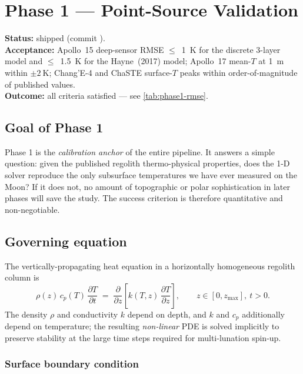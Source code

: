 \chapter{Phase 1 --- Point-Source Validation}
\label{chap:phase1}

\begin{milestone}
\textbf{Status:} shipped (commit ).\\
\textbf{Acceptance:} Apollo~15 deep-sensor RMSE $\le$~\SI{1}{\kelvin}
for the discrete 3-layer model and $\le$~\SI{1.5}{\kelvin} for the
Hayne~(2017) model; Apollo~17 mean-$T$ at \SI{1}{\meter} within
$\pm\SI{2}{\kelvin}$; Chang'E-4 and ChaSTE surface-$T$ peaks within
order-of-magnitude of published values.\\
\textbf{Outcome:} all criteria satisfied --- see
\cref{tab:phase1-rmse}.
\end{milestone}

\section{Goal of Phase 1}

Phase 1 is the \emph{calibration anchor} of the entire pipeline.  It
answers a simple question: given the published regolith thermo-physical
properties, does the 1-D solver reproduce the only subsurface
temperatures we have ever measured on the Moon?  If it does not, no
amount of topographic or polar sophistication in later phases will
save the study.  The success criterion is therefore quantitative and
non-negotiable.

\section{Governing equation}

The vertically-propagating heat equation in a horizontally homogeneous
regolith column is
\begin{equation}
  \rho(z)\,c_p(T)\,\frac{\partial T}{\partial t}
  \;=\;
  \frac{\partial}{\partial z}\!\left[
    k(T,z)\,\frac{\partial T}{\partial z}
  \right],
  \qquad z \in [0, z_{\max}],\ t > 0.
  \label{eq:heat1d}
\end{equation}
The density $\rho$ and conductivity $k$ depend on depth, and $k$ and
$c_p$ additionally depend on temperature; the resulting
\emph{non-linear} PDE is solved implicitly to preserve stability at
the large time steps required for multi-lunation spin-up.

\subsection{Surface boundary condition}

